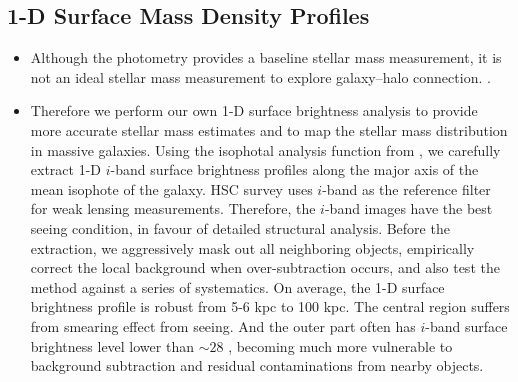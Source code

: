 \documentclass[a4paper,fleqn,usenatbib]{mnras}
\begin{document}

\subsection{1-D Surface Mass Density Profiles}
    \label{sec:1d_prof}

	\begin{itemize}
	
		\item Although the \cmod{} photometry provides a baseline stellar mass measurement,
			it is not an ideal stellar mass measurement to explore galaxy--halo connection.
			.
			
		\item Therefore we perform our own 1-D surface brightness analysis to provide
			more accurate stellar mass estimates and to map the stellar mass 
			distribution in massive galaxies. 
			Using the \ellipse{} isophotal analysis function from \iraf{}, we carefully 
			extract 1-D $i$-band surface brightness profiles along the major axis of the 
            mean isophote of the galaxy.
            HSC survey uses $i$-band as the reference filter for weak lensing measurements.
            Therefore, the $i$-band images have the best seeing condition, in favour of 
            detailed structural analysis.
			Before the extraction, we aggressively mask out all neighboring objects, 
			empirically correct the local background when over-subtraction occurs, and 
			also test the method against a series of systematics. 
			On average, the 1-D surface brightness profile is robust from 5-6 kpc to 100 kpc.
			The central region suffers from smearing effect from seeing. 
			And the outer part often has $i$-band surface brightness level lower than 
			$\sim 28$ \sb{}, becoming much more vulnerable to background subtraction 
			and residual contaminations from nearby objects.
		

\end{itemize}
\end{document}
